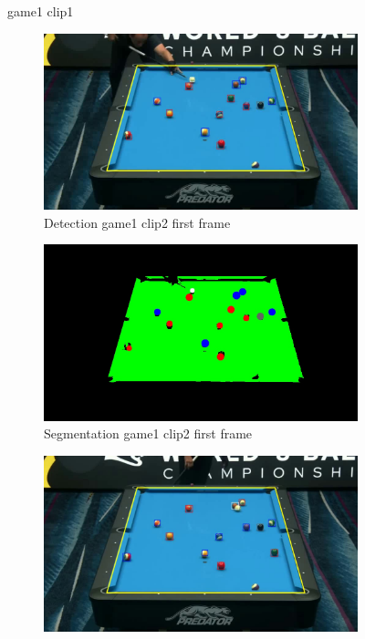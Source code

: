 \begin{figure}[H]
	\caption{game1 clip1}
\end{figure}

\begin{figure}[H]
	\centering
	\begin{subfigure}[b]{0.48\textwidth}
		\centering
		\includegraphics[width=\textwidth]{images/Detection/game1_clip2_detected_balls_first_frame.jpg}
		\caption{Detection game1 clip2 first frame}
		\label{fig: game1_clip2_first_frame_detected}
	\end{subfigure}
	\begin{subfigure}[b]{0.48\textwidth}
		\centering
		\includegraphics[width=\textwidth]{images/Segmentation/game1_clip2_segmented_balls_first_frame.jpg}
		\caption{Segmentation game1 clip2 first frame}
		\label{fig: game1_clip2_first_frame_segmented}
	\end{subfigure}
	\begin{subfigure}[b]{0.48\textwidth}
		\centering
		\includegraphics[width=\textwidth]{images/Detection/game1_clip2_detected_balls_last_frame.jpg}

\end{subfigure}
\end{figure}
